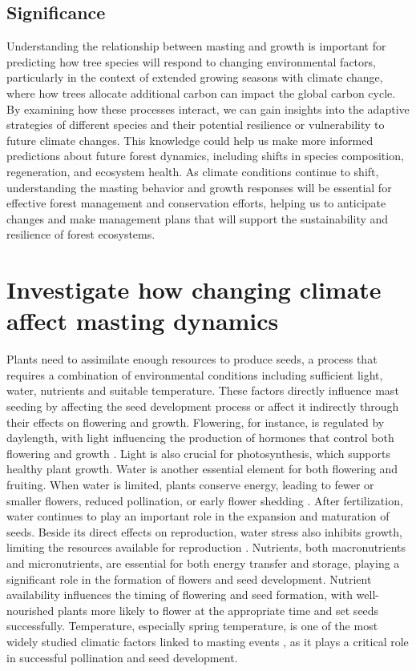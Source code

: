 \documentclass[11pt,letter]{article}
\begin{document}
\subsection{Significance}
Understanding the relationship between masting and growth is important for predicting how tree species will respond to changing environmental factors, particularly in the context of extended growing seasons with climate change, where how trees allocate additional carbon can impact the global carbon cycle. By examining how these processes interact, we can gain insights into the adaptive strategies of different species and their potential resilience or vulnerability to future climate changes. This knowledge could help us make more informed predictions about future forest dynamics, including shifts in species composition, regeneration, and ecosystem health. As climate conditions continue to shift, understanding the  masting behavior and growth responses will be essential for effective forest management and conservation efforts, helping us to anticipate changes and make management plans that will support the sustainability and resilience of forest ecosystems.

\section{Investigate how changing climate affect masting dynamics}
Plants need to assimilate enough resources to produce seeds, a process that requires a combination of environmental conditions including sufficient light, water, nutrients and suitable temperature. These factors directly influence mast seeding by affecting the seed development process or affect it indirectly through their effects on flowering and growth. Flowering, for instance, is regulated by daylength, with light influencing the production of hormones that control both flowering and growth \citep{lau2010plant}. Light is also crucial for photosynthesis, which supports healthy plant growth. Water is another essential element for both flowering and fruiting. When water is limited, plants conserve energy, leading to fewer or smaller flowers, reduced pollination, or early flower shedding \citep{gallagher2017shifts}. After fertilization, water continues to play an important role in the expansion and maturation of seeds. Beside its direct effects on reproduction, water stress also inhibits growth, limiting the resources available for reproduction \citep{hsiao1973plant, anjum2011morphological}. Nutrients, both macronutrients and micronutrients, are essential for both energy transfer and storage, playing a significant role in the formation of flowers and seed development. Nutrient availability influences the timing of flowering and seed formation, with well-nourished plants more likely to flower at the appropriate time and set seeds successfully. Temperature, especially spring temperature, is one of the most widely studied climatic factors linked to masting events \citep{bajocco2021characterizing, moreira2015effects, schauber2002masting, bogdziewicz2024evolutionary}, as it plays a critical role in successful pollination and seed development.
\end{document}
